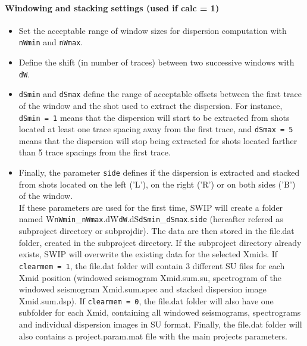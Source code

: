 \documentclass[twoside,a4paper]{article}
\begin{document}
\paragraph{Windowing and stacking settings (used if calc = 1)}
\begin{itemize}
\setlength\itemsep{2ex}
\setlength{\parindent}{5ex}

\item Set the acceptable range of window sizes for dispersion computation with \verb|nWmin| and \verb|nWmax|.

\item Define the shift (in number of traces) between two successive windows with \verb|dW|.

\item \verb|dSmin| and \verb|dSmax| define the range of acceptable offsets between the first trace of the window and the shot used to extract the dispersion. For instance, \verb|dSmin = 1| means that the dispersion will start to be extracted from shots located at least one trace spacing away from the first trace, and \verb|dSmax = 5| means that the dispersion will stop being extracted for shots located farther than 5 trace spacings from the first trace.

\item Finally, the parameter \verb|side| defines if the dispersion is extracted and stacked from shots located on the left ('L'), on the right ('R') or on both sides ('B') of the window.\\[2ex]
%
If these parameters are used for the first time, SWIP will create a folder named W\verb|nWmin|\_\verb|nWmax|.dW\verb|dW|.dS\verb|dSmin|\_\verb|dSmax|.\verb|side| (hereafter refered as subproject directory or subprojdir). The data are then stored in the file.dat folder, created in the subproject directory. If the subproject directory already exists, SWIP will overwrite the existing data for the selected Xmids. If \verb|clearmem = 1|, the file.dat folder will contain 3 different SU files for each Xmid position (windowed seismogram Xmid.sum.su, spectrogram of the windowed seismogram Xmid.sum.spec and stacked dispersion image Xmid.sum.dsp). If \verb|clearmem = 0|, the file.dat folder will also have one subfolder for each Xmid, containing all windowed seismograms, spectrograms and individual dispersion images in SU format. Finally, the file.dat folder will also contains a project.param.mat file with the main projects parameters.
\end{itemize}
\end{document}

